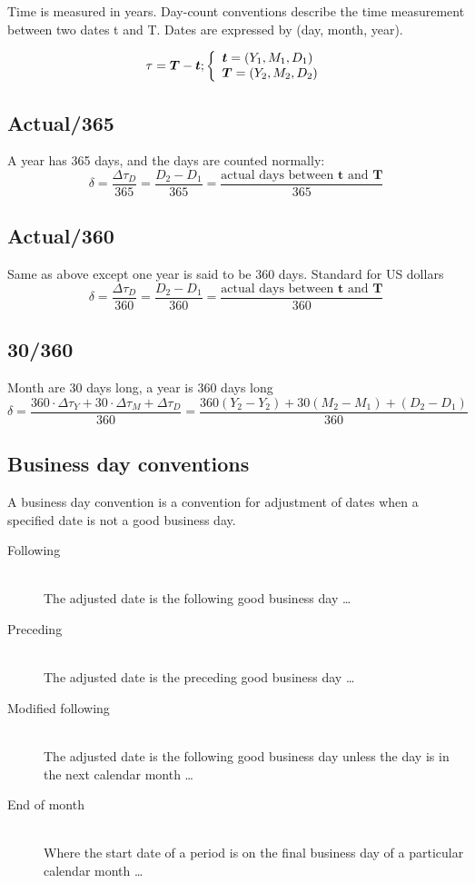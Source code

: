 \documentclass[11pt,a4paper]{article}
\numberwithin{equation}{section}
\begin{document}
	Time is measured in years. Day-count conventions describe the time measurement between two
	dates t and T. Dates are expressed by (day, month, year). 

	\[ \tau = \boldsymbol{T} - \boldsymbol{t};  \left\{
	  \begin{array}{l l}
		  \boldsymbol{t} = (Y_1, M_1, D_1) \\
	\boldsymbol{T}=(Y_2,M_2,D_2)
	  \end{array} \right.\]


	\subsection{Actual/365}
	A year has 365 days, and the days are counted normally:
	\[
	\delta = \frac{\Delta \tau_D}{365} = \frac{D_2-D_1}{365} = \frac{\text{actual days between } \boldsymbol{t} \text{ and } \boldsymbol{T}}{365}
	\]
	\subsection{Actual/360}
	Same as above except one year is said to be 360 days. Standard for US dollars
	\[
	\delta = \frac{\Delta \tau_D}{360} =\frac{D_2-D_1}{360} = \frac{\text{actual days between } \boldsymbol{t} \text{ and } \boldsymbol{T}}{360}
	\]
	\subsection{30/360}
	Month are 30 days long, a year is 360 days long
	\[
	\delta = \frac{360 \cdot \Delta \tau_Y + 30 \cdot \Delta \tau_M + \Delta \tau_D}{360} =\frac{360(Y_2-Y_2)+30(M_2-M_1)+(D_2-D_1)}{360}
	\]

	\subsection{Business day conventions}
	A business day convention is a convention for adjustment of dates when a specified date is not a good business day. 
	\begin{description}
	  \item[Following] \hfill \\
	The adjusted date is the following good business day \ldots
	  \item[Preceding] \hfill \\
		The adjusted date is the preceding good business day \ldots
	  \item[Modified following] \hfill \\
	  The adjusted date is the following good business day unless the day is in the next calendar month \ldots
	  \item[End of month] \hfill \\
	Where the start date of a period is on the final business day of a particular calendar month \ldots
	\end{description}



\newpage



\end{document}
